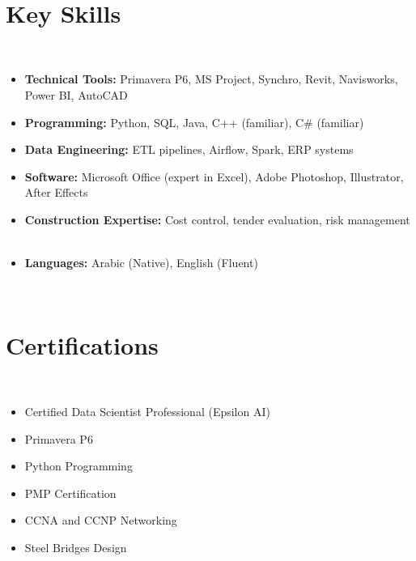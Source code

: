 \documentclass[10pt, letterpaper]{article}
\begin{document}
    \section{Key Skills}
    \begin{itemize}[leftmargin=*]
        \item \textbf{Technical Tools:} Primavera P6, MS Project, Synchro, Revit, Navisworks, Power BI, AutoCAD
        \item \textbf{Programming:} Python, SQL, Java, C++ (familiar), C\# (familiar)
        \item \textbf{Data Engineering:} ETL pipelines, Airflow, Spark, ERP systems
        \item \textbf{Software:} Microsoft Office (expert in Excel), Adobe Photoshop, Illustrator, After Effects
        \item \textbf{Construction Expertise:} Cost control, tender evaluation, risk management
        \item \textbf{Languages:} Arabic (Native), English (Fluent)
    \end{itemize}
    
    \section{Certifications}
    \begin{itemize}[leftmargin=*]
        \item Certified Data Scientist Professional (Epsilon AI)
        \item Primavera P6
        \item Python Programming
        \item PMP Certification
        \item CCNA and CCNP Networking
        \item Steel Bridges Design
    \end{itemize}
\end{document}

